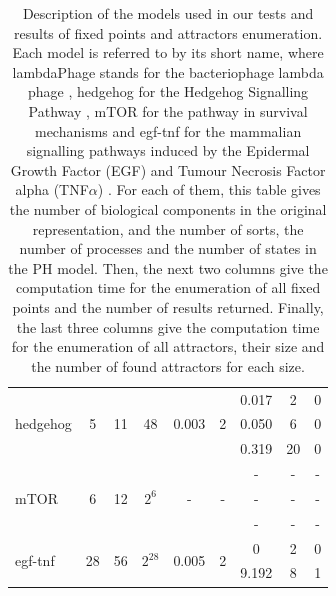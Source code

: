 \begin{changemargin}{-3cm}{-3cm}
\begin{center}
\begin{table}[ht]
\begin{center}
\begin{tabular}{| l || c | c | c || c | c || c | c | c |}
\hline
 \multirow{3}{*}{hedgehog}  & \multirow{3}{*}{5} & \multirow{3}{*}{11} & \multirow{3}{*}{48} & \multirow{3}{*}{0.003} & \multirow{3}{*}{2} & 0.017 & 2 & 0\\
 & & & & & & 0.050 & 6 & 0\\
 & & & & & & 0.319 & 20 & 0\\
\hline
 \multirow{3}{*}{mTOR}  & \multirow{3}{*}{6} & \multirow{3}{*}{12} & \multirow{3}{*}{$2^6$} & \multirow{3}{*}{-} & \multirow{3}{*}{-} & - & - & -\\
 & & & & & & - & - & -\\
 & & & & & & - & - & -\\
\hline
 \multirow{3}{*}{egf-tnf}  & \multirow{3}{*}{28} & \multirow{3}{*}{56} & \multirow{3}{*}{$2^{28}$} & \multirow{3}{*}{0.005} & \multirow{3}{*}{2} & 0 & 2 & 0\\
 & & & & & & 9.192 & 8 & 1\\
\hline
\end{tabular}
\vspace*{4pt}
\caption{\label{tab:models}%
Description of the models used in our tests and results of fixed points and attractors enumeration.
Each model is referred to by its short name, where
lambdaPhage stands for the bacteriophage lambda phage \cite{thieffry1995dynamical}, hedgehog for the Hedgehog Signalling Pathway \cite{stecca2010context}, mTOR for the pathway in survival mechanisms \cite{javle2010inhibition} and egf-tnf for the mammalian signalling pathways induced by the Epidermal Growth Factor (EGF) and Tumour Necrosis Factor alpha (TNF$\alpha$) \cite{chaouiya2013sbml}.
For each of them, this table gives the number of biological components
in the original representation,
and the number of sorts, the number of processes
and the number of states in the PH model.
Then, the next two columns give the computation time for the enumeration of all fixed points and the number of results returned. Finally, the last three columns give the computation time for the enumeration of all attractors, their size and the number of found attractors for each size.
}
\end{center}
\end{table}
\end{center}
\end{changemargin}
